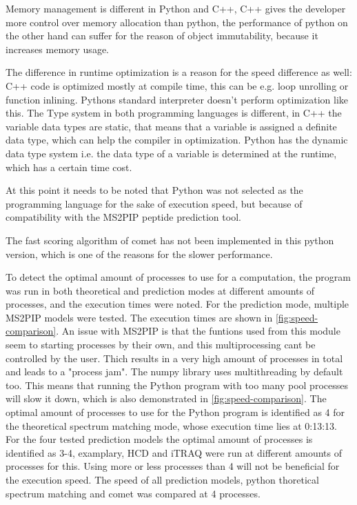 \documentclass[11pt]{article}
\begin{document}
Memory management is different in Python and C++, C++ gives the developer more control over memory allocation than python, the performance of python on the other hand can suffer for the reason of object immutability, because it increases memory usage. 

The difference in runtime optimization is a reason for the speed difference as well: C++ code is optimized mostly at compile time, this can be e.g. loop unrolling or function inlining. Pythons standard interpreter doesn't perform optimization like this. The Type system in both programming languages is different, in C++ the variable data types are static, that means that a variable is assigned a definite data type, which can help the compiler in optimization. Python has the dynamic data type system i.e. the data type of a variable is determined at the runtime, which has a certain time cost.

At this point it needs to be noted that Python was not selected as the programming language for the sake of execution speed, but because of compatibility with the MS2PIP peptide prediction tool.

The fast scoring algorithm of comet has not been implemented in this python version, which is one of the reasons for the slower performance.

To detect the optimal amount of processes to use for a computation, the program was run in both theoretical and prediction modes at different amounts of processes, and the execution times were noted. For the prediction mode, multiple MS2PIP models were tested. The execution times are shown in \cref{fig:speed-comparison}. An issue with MS2PIP is that the funtions used from this module seem to starting processes by their own, and this multiprocessing cant be controlled by the user. Thich results in a very high amount of processes in total and leads to a "process jam". The numpy library uses multithreading by default too. This means that running the Python program with too many pool processes will slow it down, which is also demonstrated in \cref{fig:speed-comparison}. The optimal amount of processes to use for the Python program is identified as 4 for the theoretical spectrum matching mode, whose execution time lies at 0:13:13. For the four tested prediction models the optimal amount of processes is identified as 3-4, examplary, HCD and iTRAQ were run at different amounts of processes for this. Using more or less processes than 4 will not be beneficial for the execution speed. The speed of all prediction models, python thoretical spectrum matching and comet was compared at 4 processes.
\end{document}
